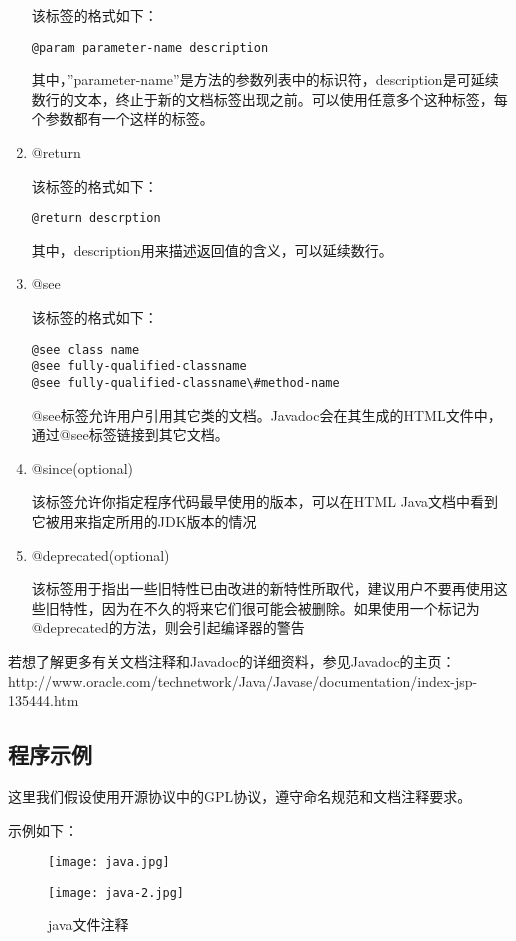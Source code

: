 \begin{enumerate}
该标签的格式如下：
\begin{lstlisting}
@param parameter-name description
\end{lstlisting}
其中，”parameter-name”是方法的参数列表中的标识符，description是可延续数行的文本，终止于新的文档标签出现之前。可以使用任意多个这种标签，每个参数都有一个这样的标签。

\item @return

该标签的格式如下：
\begin{lstlisting}
@return descrption
\end{lstlisting}
其中，description用来描述返回值的含义，可以延续数行。

\item @see

该标签的格式如下：
\begin{lstlisting}
@see class name
@see fully-qualified-classname
@see fully-qualified-classname\#method-name
\end{lstlisting}
@see标签允许用户引用其它类的文档。Javadoc会在其生成的HTML文件中，通过@see标签链接到其它文档。

\item @since(optional)

该标签允许你指定程序代码最早使用的版本，可以在HTML Java文档中看到它被用来指定所用的JDK版本的情况

\item	 @deprecated(optional)

该标签用于指出一些旧特性已由改进的新特性所取代，建议用户不要再使用这些旧特性，因为在不久的将来它们很可能会被删除。如果使用一个标记为@deprecated的方法，则会引起编译器的警告
\end{enumerate}

若想了解更多有关文档注释和Javadoc的详细资料，参见Javadoc的主页：
http://www.oracle.com/technetwork/Java/Javase/documentation/index-jsp-135444.htm

\newpage
\subsection{程序示例}

这里我们假设使用开源协议中的GPL协议，遵守命名规范和文档注释要求。

示例如下：
\begin{figure}[htpd] 
 \centering 
 \begin{minipage}[t]{0.5\textwidth} 
   \centering 
   \texttt{[image: java.jpg]} 
 \end{minipage}%
 \begin{minipage}[t]{0.5\textwidth} 
   \centering 
   \texttt{[image: java-2.jpg]} 
 \end{minipage}%
 \caption{ java文件注释}
\end{figure}

